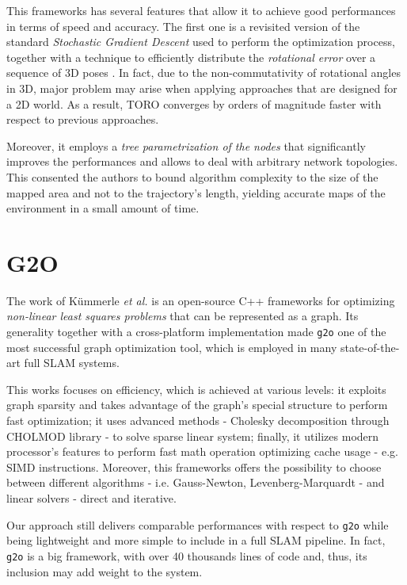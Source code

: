This frameworks has several features that allow it to achieve good performances in terms of speed and accuracy. The first one is a revisited version of the standard \textit{Stochastic Gradient Descent} used to perform the optimization process, together with a technique to efficiently distribute the \textit{rotational error} over a sequence of 3D poses \cite{grisetti2007efficient}. In fact, due to the non-commutativity of rotational angles in 3D, major problem may arise when applying approaches that are designed for a 2D world. As a result, TORO converges by orders of magnitude faster with respect to previous approaches.

Moreover, it employs a \textit{tree parametrization of the nodes} \cite{grisetti2007tree} that significantly improves the performances and allows to deal with arbitrary network topologies. This consented the authors to bound algorithm complexity to the size of the mapped area and not to the trajectory's length, yielding accurate maps of the environment in a small amount of time.

\section{G2O}\label{sec:g2o}
The work of K\"ummerle \textit{et al.} \cite{kummerle2011g} is an open-source C++ frameworks for optimizing \textit{non-linear least squares problems} that can be represented as a graph. Its generality together with a cross-platform implementation made \texttt{g2o} one of the most successful graph optimization tool, which is employed in many state-of-the-art full SLAM systems. 

This works focuses on efficiency, which is achieved at various levels: it exploits graph sparsity and takes advantage of the graph's special structure to perform fast optimization; it uses advanced methods - Cholesky decomposition through CHOLMOD library - to solve sparse linear system; finally, it utilizes modern processor's features to perform fast math operation optimizing cache usage - e.g. SIMD instructions. Moreover, this frameworks offers the possibility to choose between different algorithms - i.e. Gauss-Newton, Levenberg-Marquardt - and linear solvers - direct and iterative.

Our approach still delivers comparable performances with respect to \texttt{g2o} while being lightweight and more simple to include in a full SLAM pipeline. In fact, \texttt{g2o} is a big framework, with over 40 thousands lines of code and, thus, its inclusion may add weight to the system.

